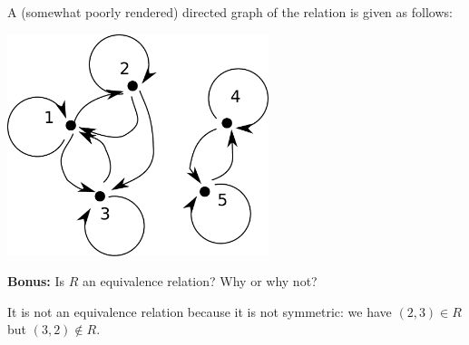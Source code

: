 \documentclass[12pt]{article}
\begin{document}
\begin{enumerate}
 A (somewhat poorly rendered) directed graph of the relation is given as follows:
\begin{center}
\includegraphics[width=3in]{digraph.pdf}
\end{center}

\bigskip

{\bf Bonus:} Is $R$ an equivalence relation? Why or why not?

\bigskip

It is not an equivalence relation because it is not symmetric: we have $(2,3)\in R$ but $(3,2)\notin R$.
\end{enumerate}
\end{document}
